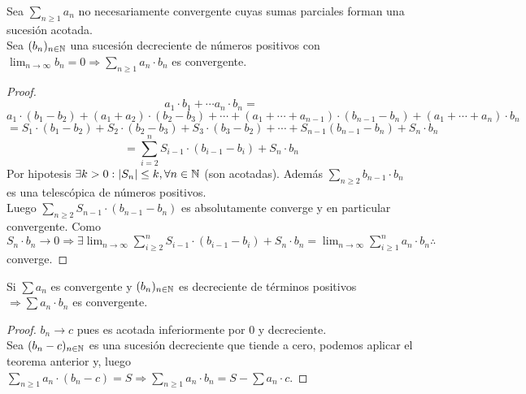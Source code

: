 \begin{theorem}
  Sea $\sum_{n \geq 1} a_n$ no necesariamente convergente cuyas sumas parciales forman una sucesión acotada. \\
  Sea $(b_n)_{n \in \mathbb{N}}$ una sucesión decreciente de números positivos con $\lim_{n \to \infty} b_n = 0 \Rightarrow \sum_{n \geq 1} a_n \cdot b_n$ es convergente.

  \begin{proof}
    \begin{equation}
      a_1 \cdot b_1 + \cdots a_n \cdot b_n =
    \end{equation}
    \begin{equation}
      a_1 \cdot (b_1 - b_2) + (a_1 + a_2) \cdot (b_2 - b_3) + \cdots + (a_1 + \cdots + a_{n-1}) \cdot (b_{n-1} - b_n) + (a_1 + \cdots + a_n) \cdot b_n
    \end{equation}
    \begin{equation}
      = S_1 \cdot (b_1 - b_2) + S_2 \cdot (b_2 - b_3) + S_3 \cdot (b_3 - b_2) + \cdots + S_{n-1} (b_{n-1} - b_n) + S_n \cdot b_n
    \end{equation}
    \begin{equation}
      = \sum_{i = 2}^n S_{i-1} \cdot (b_{i-1} - b_i) + S_n \cdot b_n
    \end{equation}
    Por hipotesis $\exists k > 0 : |S_n| \leq k, \forall n \in \mathbb{N}$ (son acotadas). Además $\sum_{n \geq 2} b_{n-1} \cdot b_n$ es una telescópica de números positivos. \\
    Luego $\sum_{n \geq 2} S_{n-1} \cdot (b_{n-1} - b_n)$ es absolutamente converge y en particular convergente.
    Como $S_n \cdot b_n \to 0 \Rightarrow \exists \lim_{n \to \infty} \sum_{i \geq 2}^n S_{i-1} \cdot (b_{i-1} - b_i) + S_n \cdot b_n = \lim_{n \to \infty} \sum_{i \geq 1}^n a_n \cdot b_n \therefore$ converge.
  \end{proof}
\end{theorem}

\begin{corollary}[Abel]
  Si $\sum a_n$ es convergente y $(b_n)_{n \in \mathbb{N}}$ es decreciente de términos positivos $\Rightarrow \sum a_n \cdot b_n$ es convergente.
  \begin{proof}
    $b_n \to c$ pues es acotada inferiormente por $0$ y decreciente. \\
    Sea $(b_n - c)_{n \in \mathbb{N}}$ es una sucesión decreciente que tiende a cero, podemos aplicar el teorema anterior y, luego $\sum_{n \geq 1} a_n \cdot (b_n - c) = S \Rightarrow \sum_{n \geq 1} a_n \cdot b_n = S - \sum a_n \cdot c$.
  \end{proof}
\end{corollary}

